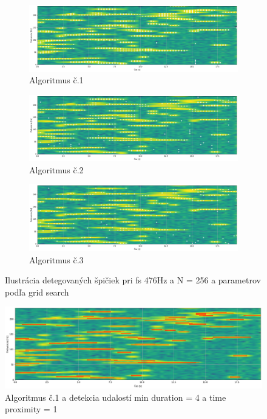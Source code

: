 \begin{figure}[h]
	\centering
     \begin{subfigure}{\textwidth}
        \centering
     	\includegraphics[width=\textwidth]{figures/verification/Sythetic-FFT-A1-476-256.png}
     	\caption{Algoritmus č.1}
     \end{subfigure}
     \begin{subfigure}{\textwidth}
    	\centering
        \includegraphics[width=\textwidth]{figures/verification/Sythetic-FFT-A2-476-256.png}
        \caption{Algoritmus č.2}
     \end{subfigure}
      \begin{subfigure}{\textwidth}
    	\centering
        \includegraphics[width=\textwidth]{figures/verification/Sythetic-FFT-A3-476-256.png}
        \caption{Algoritmus č.3}
     \end{subfigure}     
     \caption{Ilustrácia detegovaných špičiek pri fs 476Hz a N = 256 a parametrov podľa grid search}
\end{figure}

\begin{figure}[h]
   \centering
    \includegraphics[width=\textwidth]{figures/verification/Sythetic-A1-events.png}
   \caption{Algoritmus č.1 a detekcia udalostí min duration = 4 a time proximity = 1}
\end{figure}  



